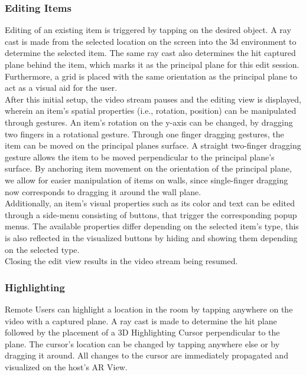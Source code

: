 \documentclass{article}
\begin{document}
\subsubsection{Editing Items}
Editing of an existing item is triggered by tapping on the desired object. A ray cast is made from the selected location on the screen into the 3d environment to determine the selected item. The same ray cast also determines the hit captured plane behind the item, which marks it as the principal plane for this edit session. Furthermore, a grid is placed with the same orientation as the principal plane to act as a visual aid for the user.\\
After this initial setup, the video stream pauses and the editing view is displayed, wherein an item's spatial properties (i.e., rotation, position) can be manipulated through gestures. An item's rotation on the y-axis can be changed, by dragging two fingers in a rotational gesture. Through  one finger dragging gestures, the item can be moved on the principal planes surface. A straight two-finger dragging gesture allows the item to be moved perpendicular to the principal plane's surface. By anchoring item movement on the orientation of the principal plane, we allow for easier manipulation of items on walls, since single-finger dragging now corresponds to dragging it around the wall plane.\\
Additionally, an item's visual properties such as its color and text can be edited through a side-menu consisting of buttons, that trigger the corresponding popup menus. The available properties differ depending on the selected item's type, this is also reflected in the visualized buttons by hiding and showing them depending on the selected type.\\
Closing the edit view results in the video stream being resumed.

\subsubsection{Highlighting}
Remote Users can highlight a location in the room by tapping anywhere on the video with a captured plane. A ray cast is made to determine the hit plane followed by the placement of a 3D Highlighting Cursor perpendicular to the plane. The cursor's location can be changed by tapping anywhere else or by dragging it around. All changes to the cursor are immediately propagated and visualized on the host's AR View.\\
\end{document}

